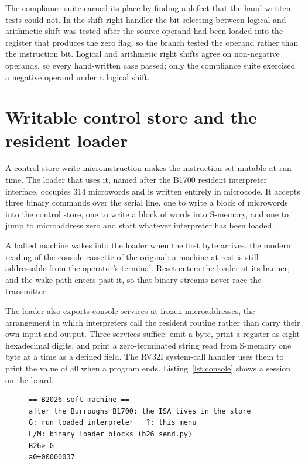\documentclass[11pt,a4paper]{article}
\begin{document}
The compliance suite earned its place by finding a defect that the
hand-written tests could not. In the shift-right handler the bit
selecting between logical and arithmetic shift was tested after the
source operand had been loaded into the register that produces the zero
flag, so the branch tested the operand rather than the instruction bit.
Logical and arithmetic right shifts agree on non-negative operands, so
every hand-written case passed; only the compliance suite exercised a
negative operand under a logical shift.

\section{Writable control store and the resident loader}
\label{sec:store}

A control store write microinstruction makes the instruction set
mutable at run time. The loader that uses it, named after the B1700
resident interpreter interface, occupies 314 microwords and is written
entirely in microcode. It accepts three binary commands over the serial
line, one to write a block of microwords into the control store, one to
write a block of words into S-memory, and one to jump to microaddress
zero and start whatever interpreter has been loaded.

A halted machine wakes into the loader when the first byte arrives, the
modern reading of the console cassette of the original: a machine at
rest is still addressable from the operator's terminal. Reset enters
the loader at its banner, and the wake path enters past it, so that
binary streams never race the transmitter.

The loader also exports console services at frozen microaddresses, the
arrangement in which interpreters call the resident routine rather than
carry their own input and output. Three services suffice: emit a byte,
print a register as eight hexadecimal digits, and print a
zero-terminated string read from S-memory one byte at a time as a
defined field. The RV32I system-call handler uses them to print the
value of a0 when a program ends. Listing~\ref{lst:console} shows a
session on the board.

\begin{figure}[!htb]
\begin{lstlisting}[caption={A console session on the board, in which
the RV32I interpreter is started and reports its result.},
label={lst:console}]
== B2026 soft machine ==
after the Burroughs B1700: the ISA lives in the store
G: run loaded interpreter   ?: this menu
L/M: binary loader blocks (b26_send.py)
B26> G
a0=00000037
\end{lstlisting}
\end{figure}
\end{document}
